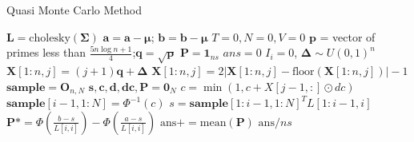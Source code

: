 \begin{frame}{Quasi Monte Carlo Method}
\begin{algorithm}[H]
	\caption{Multivariate Normal Probability with Quasi Monte Carlo Method}
	\begin{algorithmic}[1]
		\tiny
		\State $\mathbf{L}=\text{cholesky}(\boldsymbol{\Sigma})$
		\State $\mathbf{a}=\mathbf{a}-\boldsymbol{\mu}$; $\mathbf{b}=\mathbf{b}-\boldsymbol{\mu}$
		\State $T=0,N=0,V=0$
		\State $\mathbf{p}$ = vector of primes less than $\frac{5n\log{n+1}}{4}$;$\mathbf{q}=\sqrt{\mathbf{p}}$
		\State $\mathbf{P}=\mathbf{1}_{ns}$
		\State $ans = 0$
		\State $I_i=0$, $\boldsymbol{\Delta}\sim U(0,1)^n$
		\State $\mathbf{X}[1:n,j]=(j+1)\mathbf{q}+\boldsymbol{\Delta}$
		\State $\mathbf{X}[1:n,j]=2\lvert\mathbf{X}[1:n,j]-\text{floor}(\mathbf{X}[1:n,j])\rvert-1$
		\EndFor
		\State $\mathbf{sample}=\mathbf{O}_{n,N}$
		\State $\mathbf{s},\mathbf{c},\mathbf{d},\mathbf{dc}, \mathbf{P}=\mathbf{0}_N$
		\State $c=\min(1, c + X[j-1,:]\odot dc)$
		\State $\mathbf{sample}[i-1,1:N] = \Phi^{-1}(c)$
		\State $s = \mathbf{sample}[1:i-1,1:N]^TL[1:i-1, i]$
		\EndIf
		\State $\mathbf{P} *= \Phi(\frac{b-s}{L[i,i]}) - \Phi(\frac{a-s}{L[i,i]})$
		\EndFor
		\State $\text{ans} += \text{mean}(\mathbf{P})$
		\EndFor
		\State\Return $\text{ans}/ns$
		\EndProcedure
	\end{algorithmic}\label{alg:QMC}
\end{algorithm}
\end{frame}

